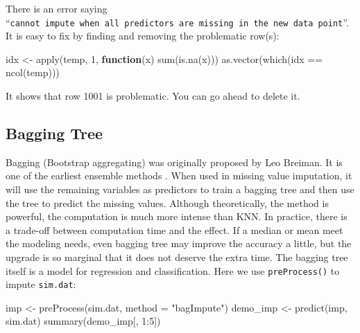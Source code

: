 \documentclass[
  12pt,
]{krantz}
\makeatletter
\newenvironment{Shaded}{\begin{snugshade}}{\end{snugshade}}
\newcommand{\AttributeTok}[1]{\textcolor[rgb]{0.61,0.61,0.61}{#1}}
\newcommand{\ControlFlowTok}[1]{\textcolor[rgb]{0.27,0.27,0.27}{\textbf{#1}}}
\newcommand{\DecValTok}[1]{\textcolor[rgb]{0.06,0.06,0.06}{#1}}
\newcommand{\FunctionTok}[1]{\textcolor[rgb]{0,0,0}{#1}}
\newcommand{\NormalTok}[1]{#1}
\newcommand{\OtherTok}[1]{\textcolor[rgb]{0.37,0.37,0.37}{#1}}
\newcommand{\SpecialCharTok}[1]{\textcolor[rgb]{0,0,0}{#1}}
\newcommand{\StringTok}[1]{\textcolor[rgb]{0.5,0.5,0.5}{#1}}
\newenvironment{kframe}{%
\medskip{}
\setlength{\fboxsep}{.8em}
 \def\at@end@of@kframe{}%
 \ifinner\ifhmode%
  \def\at@end@of@kframe{\end{minipage}}%
  \begin{minipage}{\columnwidth}%
 \fi\fi%
 \def\FrameCommand##1{\hskip\@totalleftmargin \hskip-\fboxsep
 \colorbox{shadecolor}{##1}\hskip-\fboxsep
     \hskip-\linewidth \hskip-\@totalleftmargin \hskip\columnwidth}%
 \MakeFramed {\advance\hsize-\width
   \@totalleftmargin\z@ \linewidth\hsize
   \@setminipage}}%
 {\par\unskip\endMakeFramed%
 \at@end@of@kframe}
\renewenvironment{Shaded}{\begin{kframe}}{\end{kframe}}
\makeatother
\begin{document}
There is an error saying ``\texttt{cannot\ impute\ when\ all\ predictors\ are\ missing\ in\ the\ new\ data\ point}''. It is easy to fix by finding and removing the problematic row(s):

\begin{Shaded}
\begin{Highlighting}[]
\NormalTok{idx }\OtherTok{\textless{}{-}} \FunctionTok{apply}\NormalTok{(temp, }\DecValTok{1}\NormalTok{, }\ControlFlowTok{function}\NormalTok{(x) }\FunctionTok{sum}\NormalTok{(}\FunctionTok{is.na}\NormalTok{(x)))}
\FunctionTok{as.vector}\NormalTok{(}\FunctionTok{which}\NormalTok{(idx }\SpecialCharTok{==} \FunctionTok{ncol}\NormalTok{(temp)))}
\end{Highlighting}
\end{Shaded}

It shows that row 1001 is problematic. You can go ahead to delete it.

\hypertarget{bagging-tree}{%
\subsection{Bagging Tree}\label{bagging-tree}}

Bagging (Bootstrap aggregating) was originally proposed by Leo Breiman. It is one of the earliest ensemble methods \citep{bag1}. When used in missing value imputation, it will use the remaining variables as predictors to train a bagging tree and then use the tree to predict the missing values. Although theoretically, the method is powerful, the computation is much more intense than KNN. In practice, there is a trade-off between computation time and the effect. If a median or mean meet the modeling needs, even bagging tree may improve the accuracy a little, but the upgrade is so marginal that it does not deserve the extra time. The bagging tree itself is a model for regression and classification. Here we use \texttt{preProcess()} to impute \texttt{sim.dat}:

\begin{Shaded}
\begin{Highlighting}[]
\NormalTok{imp }\OtherTok{\textless{}{-}} \FunctionTok{preProcess}\NormalTok{(sim.dat, }\AttributeTok{method =} \StringTok{"bagImpute"}\NormalTok{)}
\NormalTok{demo\_imp }\OtherTok{\textless{}{-}} \FunctionTok{predict}\NormalTok{(imp, sim.dat)}
\FunctionTok{summary}\NormalTok{(demo\_imp[, }\DecValTok{1}\SpecialCharTok{:}\DecValTok{5}\NormalTok{])}
\end{Highlighting}
\end{Shaded}
\end{document}
